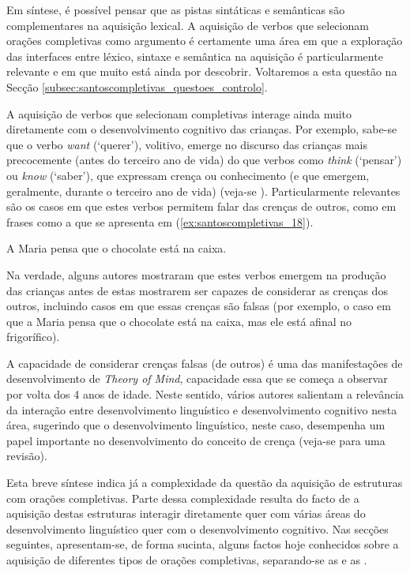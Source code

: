 \documentclass[output=paper]{LSP/langsci}
\begin{document}
Em síntese, é possível pensar que as pistas sintáticas e semânticas são complementares na aquisição lexical. A aquisição de verbos que selecionam orações completivas como argumento é certamente uma área em que a exploração das interfaces entre léxico, sintaxe e semântica na aquisição é particularmente relevante e em que muito está ainda por descobrir. Voltaremos a esta questão na Secção \ref{subsec:santoscompletivas_questoes_controlo}.

A aquisição de verbos que selecionam completivas interage ainda muito diretamente com o desenvolvimento cognitivo das crianças. Por exemplo, sabe-se que o verbo \textit{want} (‘querer’), volitivo, emerge no discurso das crianças mais precocemente (antes do terceiro ano de vida) do que verbos como \textit{think} (‘pensar’) ou \textit{know} (‘saber’), que expressam crença ou conhecimento (e que emergem, geralmente, durante o terceiro ano de vida) (veja-se \citealt{devilliers2007}). Particularmente relevantes são os casos em que estes verbos permitem falar das crenças de outros, como em frases como a que se apresenta em (\ref{ex:santoscompletivas_18}). 

\ea\label{ex:santoscompletivas_18}
A Maria pensa que o chocolate está na caixa.
\z

Na verdade, alguns autores mostraram que estes verbos emergem na produção das crianças antes de estas mostrarem ser capazes de considerar as crenças dos outros, incluindo casos em que essas crenças são falsas (por exemplo, o caso em que a Maria pensa que o chocolate está na caixa, mas ele está afinal no frigorífico).

A capacidade de considerar crenças falsas (de outros) é uma das manifestações de desenvolvimento de \textit{Theory of Mind}, capacidade essa que se começa a observar por volta dos 4 anos de idade. Neste sentido, vários autores salientam a relevância da interação entre desenvolvimento linguístico e desenvolvimento cognitivo nesta área, sugerindo que o desenvolvimento linguístico, neste caso, desempenha um papel importante no desenvolvimento do conceito de crença (veja-se \citealt{devilliers2007} para uma revisão).

Esta breve síntese indica já a complexidade da questão da aquisição de estruturas com orações completivas. Parte dessa complexidade resulta do facto de a aquisição destas estruturas interagir diretamente quer com várias áreas do desenvolvimento linguístico quer com o desenvolvimento cognitivo. Nas secções seguintes, apresentam-se, de forma sucinta, alguns factos hoje conhecidos sobre a aquisição de diferentes tipos de orações completivas, separando-se as  e as .
\end{document}
